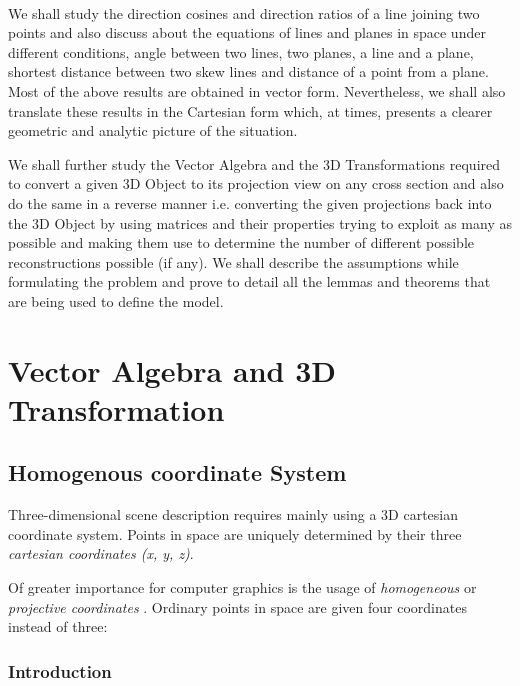 \documentclass[12pt]{report}
\begin{document}
\\
\vspace{0.5cm}

We shall study the direction cosines and direction ratios of a line joining two points and also discuss about the equations of lines and planes in space under different conditions, angle between two lines, two planes, a line and a plane, shortest distance between two skew lines and distance of a point from a plane. Most of the above results are obtained in vector form. Nevertheless, we shall also translate these results in the Cartesian form which, at times, presents a clearer geometric and analytic picture of the situation.
\\
\vspace{0.5cm}

We shall further study the Vector Algebra and the 3D Transformations required to convert a given 3D Object to its projection view on any cross section and also do the same in a reverse manner i.e. converting the given projections back into the 3D Object by using matrices and their properties trying to exploit as many as possible and making them use to determine the number of different possible reconstructions possible (if any). We shall describe the assumptions while formulating the problem and prove to detail all the lemmas and theorems that are being used to define the model.
\\

\chapter{Vector Algebra and 3D Transformation}

\section{Homogenous coordinate System}

Three-dimensional scene description requires mainly using a 3D cartesian coordinate system. Points in space are uniquely determined by their three \textit{cartesian coordinates (x, y, z)}.

\vspace{0.5cm}
\noindent Of greater importance for computer graphics is the usage of \textit{ homogeneous} or \textit{projective coordinates }. Ordinary points in space are given four coordinates instead of three:


\subsection{Introduction}
\end{document}
